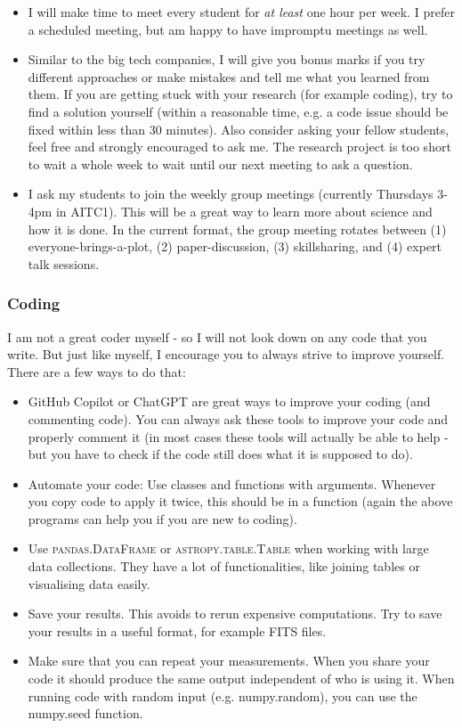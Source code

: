 \documentclass[fleqn,usenatbib]{mnras}
\begin{document}
\begin{itemize}
    \item I will make time to meet every student for \textit{at least} one hour per week. I prefer a scheduled meeting, but am happy to have impromptu meetings as well.
    \item Similar to the big tech companies, I will give you bonus marks if you try different approaches or make mistakes and tell me what you learned from them. If you are getting stuck with your research (for example coding), try to find a solution yourself (within a reasonable time, e.g. a code issue should be fixed within less than 30 minutes). Also consider asking your fellow students, feel free and strongly encouraged to ask me. The research project is too short to wait a whole week to wait until our next meeting to ask a question. 
    \item I ask my students to join the weekly group meetings (currently Thursdays 3-4pm in AITC1). This will be a great way to learn more about science and how it is done. In the current format, the group meeting rotates between (1) everyone-brings-a-plot, (2) paper-discussion, (3) skillsharing, and (4) expert talk sessions.
\end{itemize}

\subsubsection{Coding}

I am not a great coder myself - so I will not look down on any code that you write. But just like myself, I encourage you to always strive to improve yourself. There are a few ways to do that:
\begin{itemize}
    \item GitHub Copilot or ChatGPT are great ways to improve your coding (and commenting code). You can always ask these tools to improve your code and properly comment it (in most cases these tools will actually be able to help - but you have to check if the code still does what it is supposed to do).
    \item Automate your code: Use classes and functions with arguments. Whenever you copy code to apply it twice, this should be in a function (again the above programs can help you if you are new to coding).
    \item Use \textsc{pandas.DataFrame} or \textsc{astropy.table.Table} when working with large data collections. They have a lot of functionalities, like joining tables or visualising data easily.
    \item Save your results. This avoids to rerun expensive computations. Try to save your results in a useful format, for example FITS files.
    \item Make sure that you can repeat your measurements. When you share your code it should produce the same output independent of who is using it. When running code with random input (e.g. numpy.random), you can use the numpy.seed function.
\end{itemize}
\end{document}
